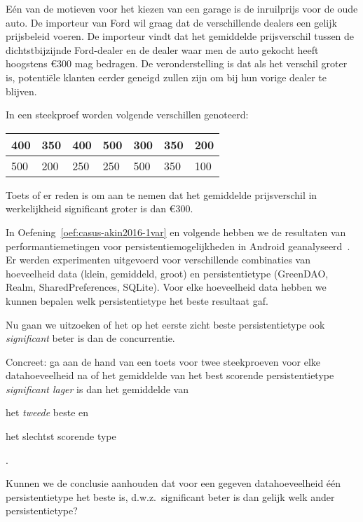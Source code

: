 \begin{exercise}
  \label{oef:prijsverschil-autos}
  
  Eén van de motieven voor het kiezen van een garage is de inruilprijs voor de oude auto. De importeur van Ford wil graag dat de verschillende dealers een gelijk prijsbeleid voeren. De importeur vindt dat het gemiddelde prijsverschil tussen de dichtstbijzijnde Ford-dealer en de dealer waar men de auto gekocht heeft hoogstens \euro{300} mag bedragen. De veronderstelling is dat als het verschil groter is, potentiële klanten eerder geneigd zullen zijn om bij hun vorige dealer te blijven.
  
  In een steekproef worden volgende verschillen genoteerd:
  
  \begin{center}
    \begin{tabular}{|l|l|l|l|l|l|l|}
      \hline
      400 & 350 & 400 & 500 & 300 & 350 & 200 \\ \hline
      500 & 200 & 250 & 250 & 500 & 350 & 100 \\ \hline
    \end{tabular}
  \end{center}

  Toets of er reden is om aan te nemen dat het gemiddelde prijsverschil in werkelijkheid significant groter is dan \euro{300}.
  
\end{exercise}

\begin{exercise}
  \label{oef:casus-akin2016-toets}
  
  In Oefening~\ref{oef:casus-akin2016-1var} en volgende hebben we de resultaten van performantiemetingen voor persistentiemogelijkheden in Android geanalyseerd~\autocite{Akin2016}. Er werden experimenten uitgevoerd voor verschillende combinaties van hoeveelheid data (klein, gemiddeld, groot) en persistentietype (GreenDAO, Realm, SharedPreferences, SQLite). Voor elke hoeveelheid data hebben we kunnen bepalen welk persistentietype het beste resultaat gaf.
  
  Nu gaan we uitzoeken of het op het eerste zicht beste persistentietype ook \emph{significant} beter is dan de concurrentie.
  
  Concreet: ga aan de hand van een toets voor twee steekproeven voor elke datahoeveelheid na of het gemiddelde van het best scorende persistentietype \emph{significant lager} is dan het gemiddelde van \begin{inparaenum}[(i)] \item het \emph{tweede} beste en \item het slechtst scorende type \end{inparaenum}.
  
  Kunnen we de conclusie aanhouden dat voor een gegeven datahoeveelheid één persistentietype het beste is, d.w.z.~significant beter is dan gelijk welk ander persistentietype?
\end{exercise}

